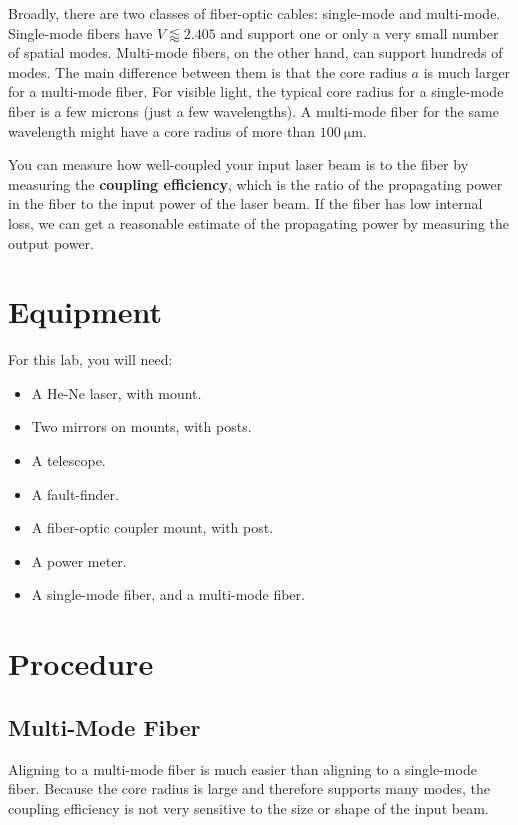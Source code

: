 \documentclass[]{manual}
\begin{document}
    Broadly, there are two classes of fiber-optic cables: single-mode and multi-mode.
    Single-mode fibers have $V \lessapprox 2.405$ and support one or only a very small number of spatial modes.
    Multi-mode fibers, on the other hand, can support hundreds of modes.
    The main difference between them is that the core radius $a$ is much larger for a multi-mode fiber.
    For visible light, the typical core radius for a single-mode fiber is a few microns (just a few wavelengths).
    A multi-mode fiber for the same wavelength might have a core radius of more than $\SI{100}{\micro\meter}$.

    You can measure how well-coupled your input laser beam is to the fiber by measuring the \textbf{coupling efficiency}, which is the ratio of the propagating power in the fiber to the input power of the laser beam.
    If the fiber has low internal loss, we can get a reasonable estimate of the propagating power by measuring the output power.

    \section*{Equipment}

    For this lab, you will need:
    \begin{itemize}
        \item A He-Ne laser, with mount.
        \item Two mirrors on mounts, with posts.
        \item A telescope.
        \item A fault-finder.
        \item A fiber-optic coupler mount, with post.
        \item A power meter.
        \item A single-mode fiber, and a multi-mode fiber.
    \end{itemize}


    \FloatBarrier
    \newpage

    \section*{Procedure}

    \subsection{Multi-Mode Fiber}

    Aligning to a multi-mode fiber is much easier than aligning to a single-mode fiber.
    Because the core radius is large and therefore supports many modes, the coupling efficiency is not very sensitive to the size or shape of the input beam.
\end{document}
